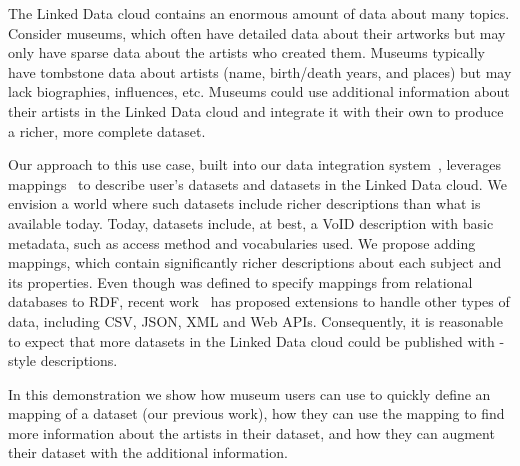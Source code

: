 The Linked Data cloud contains an enormous amount of data about many topics.
Consider museums, which often have detailed data about their artworks but may only have sparse data about the artists who created them.
Museums typically have tombstone data about artists (name, birth/death years, and places) but may lack biographies, influences, etc.
Museums could use additional information about their artists in the Linked Data cloud and integrate it with their own to produce a richer, more complete dataset.

Our approach to this use case, built into our \karma data integration system~\cite{Szekely:2013vq}, leverages \rtworml mappings~\cite{Sundara:12:RRR} to describe user's datasets and datasets in the Linked Data cloud.
We envision a world where such datasets include richer descriptions than what is available today.
Today, datasets include, at best, a VoID description\cite{Alexander:11:DLD} with basic metadata, such as access method and vocabularies used.
We propose adding \rtworml mappings, which contain significantly richer descriptions about each subject and its properties.
Even though \rtworml was defined to specify mappings from relational databases to RDF, recent work~\cite{conf/semweb/DimouSCMW13} has proposed extensions to handle other types of data, including CSV, JSON, XML and Web APIs.
Consequently, it is reasonable to expect that more datasets in the Linked Data cloud could be published with \rtworml-style descriptions.

In this demonstration we show how museum users can use \karma to quickly define an \rtworml mapping of a dataset (our previous work), how they can use the \rtworml mapping to find more information about the artists in their dataset, and how they can augment their dataset with the additional information.